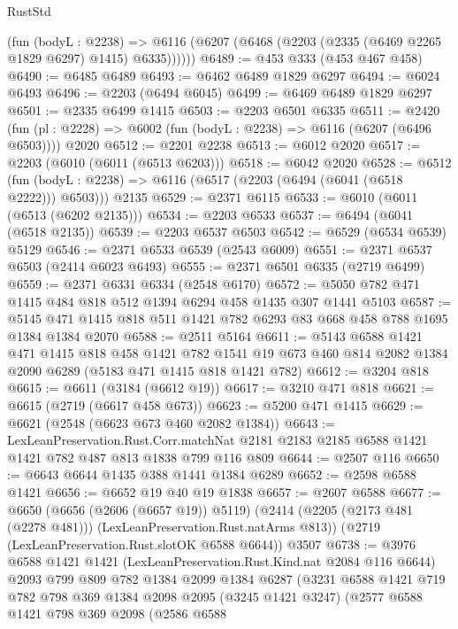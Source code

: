 \begin{lexlean}{RustStd}
\begin{coremodule}
        (fun (bodyL : @2238) =>
        @6116 (@6207 (@6468 (@2203 (@2335 (@6469 @2265 @1829 @6297) @1415) @6335))))))
@6489 := @453 @333 (@453 @467 @458)
@6490 := @6485 @6489
@6493 := @6462 @6489 @1829 @6297
@6494 := @6024 @6493
@6496 := @2203 (@6494 @6045)
@6499 := @6469 @6489 @1829 @6297
@6501 := @2335 @6499 @1415
@6503 := @2203 @6501 @6335
@6511 := @2420
    (fun (pl : @2228) => @6002 (fun (bodyL : @2238) => @6116 (@6207 (@6496 @6503))))
    @2020
@6512 := @2201 @2238
@6513 := @6012 @2020
@6517 := @2203 (@6010 (@6011 (@6513 @6203)))
@6518 := @6042 @2020
@6528 := @6512
    (fun (bodyL : @2238) => @6116 (@6517 (@2203 (@6494 (@6041 (@6518 @2222))) @6503)))
    @2135
@6529 := @2371 @6115
@6533 := @6010 (@6011 (@6513 (@6202 @2135)))
@6534 := @2203 @6533
@6537 := @6494 (@6041 (@6518 @2135))
@6539 := @2203 @6537 @6503
@6542 := @6529 (@6534 @6539) @5129
@6546 := @2371 @6533 @6539 (@2543 @6009)
@6551 := @2371 @6537 @6503 (@2414 @6023 @6493)
@6555 := @2371 @6501 @6335 (@2719 @6499)
@6559 := @2371 @6331 @6334 (@2548 @6170)
@6572 := @5050 @782 @471 @1415 @484 @818 @512 @1394 @6294 @458 @1435 @307 @1441 @5103
@6587 := @5145 @471 @1415 @818 @511 @1421 @782 @6293 @83 @668 @458 @788 @1695 @1384 @1384 @2070
@6588 := @2511 @5164
@6611 := @5143
    @6588
    @1421
    @471
    @1415
    @818
    @458
    @1421
    @782
    @1541
    @19
    @673
    @460
    @814
    @2082
    @1384
    @2090
    @6289
    (@5183 @471 @1415 @818 @1421 @782)
@6612 := @3204 @818
@6615 := @6611 (@3184 (@6612 @19))
@6617 := @3210 @471 @818
@6621 := @6615 (@2719 (@6617 @458 @673))
@6623 := @5200 @471 @1415
@6629 := @6621 (@2548 (@6623 @673 @460 @2082 @1384))
@6643 := LexLeanPreservation.Rust.Corr.matchNat
    @2181
    @2183
    @2185
    @6588
    @1421
    @1421
    @782
    @487
    @813
    @1838
    @799
    @116
    @809
@6644 := @2507 @116
@6650 := @6643 @6644 @1435 @388 @1441 @1384 @6289
@6652 := @2598 @6588 @1421
@6656 := @6652 @19 @40 @19 @1838
@6657 := @2607 @6588
@6677 := @6650
    (@6656 (@2606 (@6657 @19)) @5119)
    (@2414 (@2205 (@2173 @481 (@2278 @481))) (LexLeanPreservation.Rust.natArms @813))
    (@2719 (LexLeanPreservation.Rust.slotOK @6588 @6644))
    @3507
@6738 := @3976
    @6588
    @1421
    @1421
    (LexLeanPreservation.Rust.Kind.nat @2084 @116 @6644)
    @2093
    @799
    @809
    @782
    @1384
    @2099
    @1384
    @6287
    (@3231
      @6588
      @1421
      @719
      @782
      @798
      @369
      @1384
      @2098
      @2095
      (@3245 @1421 @3247)
      (@2577
        @6588
        @1421
        @798
        @369
        @2098
        (@2586
          @6588

\end{coremodule}
\end{lexlean}
